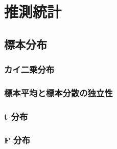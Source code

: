 \chapter{推測統計}
\label{chap:stat-inference}

\begin{chaptergoal}
\end{chaptergoal}

\section{標本分布}
\label{sec:stat-sampling-distribution}



\subsection{カイ二乗分布}

\subsection{標本平均と標本分散の独立性}

\subsection{t 分布}

\subsection{F 分布}

